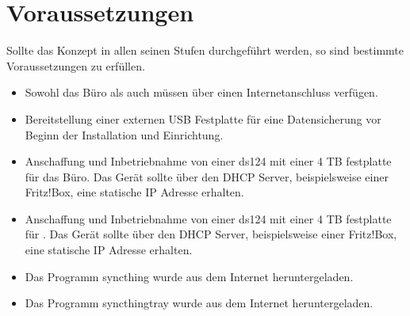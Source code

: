 

\section{Voraussetzungen}

Sollte das Konzept in allen seinen Stufen durchgeführt werden, so sind bestimmte
Voraussetzungen zu erfüllen.

\begin{itemize}
    \item Sowohl das Büro als auch  müssen über einen
          Internetanschluss verfügen.
    \item Bereitstellung einer externen USB Festplatte für eine Datensicherung
          vor Beginn der Installation und Einrichtung.
    \item Anschaffung und Inbetriebnahme von einer \gls{ds124} mit einer 4 TB
          \gls{festplatte} für das Büro. Das Gerät sollte über den DHCP Server,
          beispielsweise einer Fritz!Box, eine statische IP Adresse erhalten.
    \item Anschaffung und Inbetriebnahme von einer \gls{ds124} mit einer 4 TB
          \gls{festplatte} für . Das Gerät sollte über
          den DHCP Server, beispielsweise einer Fritz!Box, eine statische IP
          Adresse erhalten.
    \item Das Programm \gls{syncthing} wurde aus dem Internet heruntergeladen.
    \item Das Programm \gls{syncthingtray} wurde aus dem Internet heruntergeladen.
\end{itemize}
